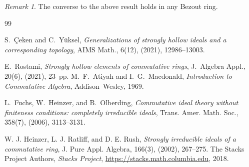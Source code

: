 \documentclass[11pt,english]{amsart}
\theoremstyle{definition}
\numberwithin{equation}{section}
\theoremstyle{remark}
\newtheorem{remark}[theorem]{Remark}
\begin{document}
\begin{remark}
The converse to the above result holds in any Bezout ring.
\end{remark}


\smallskip
\begin{thebibliography}{99}

S.~Çeken and C.~Yüksel, \emph{Generalizations of strongly hollow ideals and a corresponding topology}, AIMS Math., 6(12), (2021), 12986–13003.

E.~Rostami, \emph{Strongly hollow elements of commutative rings}, J.~Algebra Appl., 20(6), (2021), 23~pp.
M.~F.~Atiyah and I.~G.~Macdonald,
\emph{Introduction to Commutative Algebra},
Addison--Wesley, 1969.

L.~Fuchs, W.~Heinzer, and B.~Olberding, \emph{Commutative ideal theory without finiteness conditions: completely irreducible ideals}, Trans. Amer. Math. Soc., 358(7), (2006),  3113--3131.

W. J. Heinzer, L. J. Ratliff, and D. E. Rush, \emph{Strongly irreducible ideals of a commutative ring},  J. Pure Appl. Algebra, 166(3), (2002), 267--275.
The Stacks Project Authors, \emph{Stacks Project}, \url{https://stacks.math.columbia.edu}, 2018.
\end{thebibliography}
\end{document}
